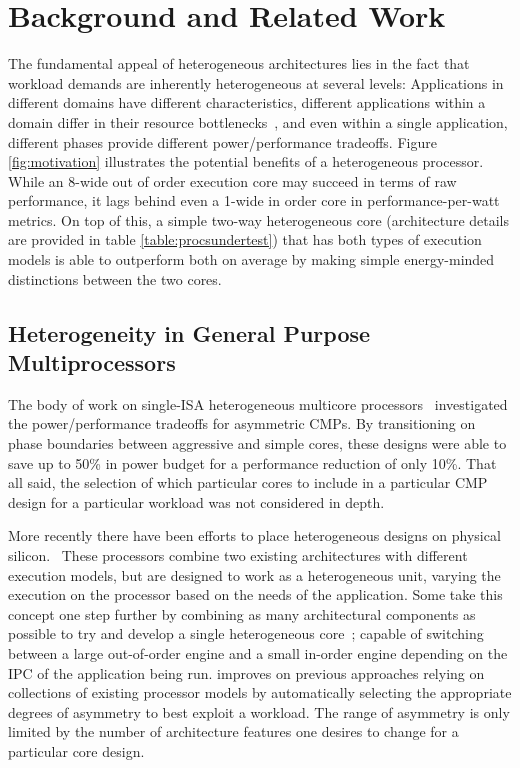 \section{Background and Related Work}
\label{sec:background}
\label{sec:related}


The fundamental appeal of heterogeneous architectures lies in the fact
that workload demands are inherently heterogeneous at several levels:
Applications in different domains have different characteristics,
different applications within a domain differ in their resource
bottlenecks~\cite{Vasilieospeakpowermicro2010}, and even within a
single application, different phases provide different
power/performance tradeoffs.  Figure \ref{fig:motivation} illustrates 
the potential benefits of a heterogeneous processor. While an 8-wide 
out of order execution core may succeed in terms of raw performance, it
lags behind even a 1-wide in order core in performance-per-watt metrics.
On top of this, a simple two-way heterogeneous core (architecture details
are provided in table \ref{table:procsundertest}) that has both types of
execution models is able to outperform both on average by making simple 
energy-minded distinctions between the two cores.

\subsection{Heterogeneity in General Purpose Multiprocessors} 
The body of work on single-ISA heterogeneous multicore
processors~\cite{Kumar03-SIHM,Kumar06-PACT-SIHM,Kumar04-SIHM} investigated the power/performance tradeoffs
for asymmetric CMPs. By transitioning on phase boundaries between
aggressive and simple cores, these designs were able to save up to 50\%
in power budget for a performance reduction of only 10\%. That all said, the
selection of which particular cores to include in a particular CMP
design for a particular workload was not considered in depth. 

More recently there have been efforts to place heterogeneous
designs on physical silicon.~\cite{ARM11-WhitePaper-BigLittle} These
processors combine two existing architectures with different execution
models, but are designed to work as a heterogeneous unit, varying the
execution on the processor based on the needs of the application. Some
take this concept one step further by combining as many architectural
components as possible to try and develop a single heterogeneous 
core~\cite{Lukefahr12-MICRO-CompositeCores}; capable of switching 
between a large out-of-order engine and a small in-order engine
depending on the IPC of the application being run. \Ravan{}
improves on previous approaches relying on collections of existing
processor models by automatically selecting the appropriate degrees of
asymmetry to best exploit a workload. The range of asymmetry is only
limited by the number of architecture features one desires to change for
a particular core design.

